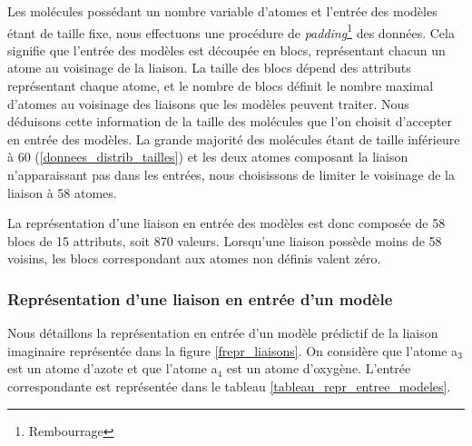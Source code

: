 \label{dist_rel_homog_entrees}

\par Les molécules possédant un nombre variable d'atomes et l'entrée des modèles étant de taille fixe, nous effectuons une procédure de \emph{padding}\footnote{Rembourrage} des données. Cela signifie que l'entrée des modèles est découpée en blocs, représentant chacun un atome au voisinage de la liaison. La taille des blocs dépend des attributs représentant chaque atome, et le nombre de blocs définit le nombre maximal d'atomes au voisinage des liaisons que les modèles peuvent traiter. Nous déduisons cette information de la taille des molécules que l'on choisit d'accepter en entrée des modèles. La grande majorité des molécules étant de taille inférieure à 60 (\ref{donnees_distrib_tailles}) et les deux atomes composant la liaison n'apparaissant pas dans les entrées, nous choisissons de limiter le voisinage de la liaison à 58 atomes.\\
\par La représentation d'une liaison en entrée des modèles est donc composée de 58 blocs de 15 attributs, soit 870 valeurs. Lorsqu'une liaison possède moins de 58 voisins, les blocs correspondant aux atomes non définis valent zéro.

\subsubsection{Représentation d'une liaison en entrée d'un modèle}

\label{dist_rel_repr_entree}

\par Nous détaillons la représentation en entrée d'un modèle prédictif de la liaison imaginaire représentée dans la figure \ref{frepr_liaisons}. On considère que l'atome a$_3$ est un atome d'azote et que l'atome a$_4$ est un atome d'oxygène. L'entrée correspondante est représentée dans le tableau \ref{tableau_repr_entree_modeles}.

